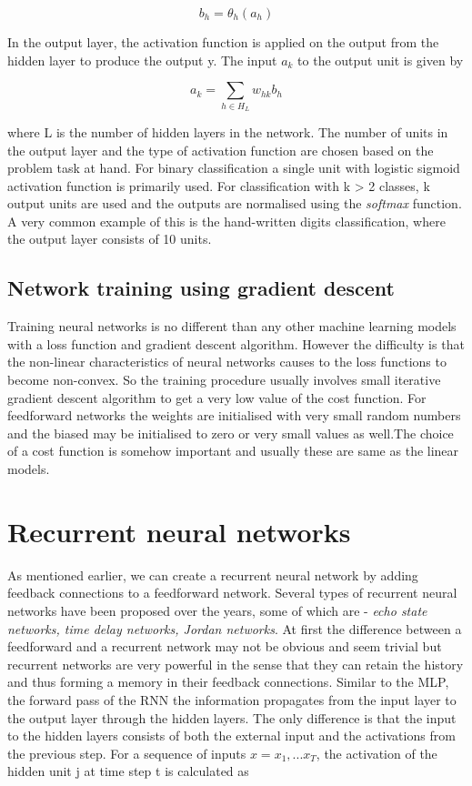     \begin{equation}
        b_{h} = \theta_{h}(a_{h})
    \end{equation}

In the output layer, the activation function is applied on the output from the hidden layer to
produce the output y. The input $a_{k}$ to the output unit is given by

    \begin{equation}
        a_{k} = \displaystyle\sum_{h \in H_{L}} w_{hk}b_{h}
    \end{equation}

where L is the number of hidden layers in the network. The number of units in the output layer
and the type of activation function are chosen based on the problem task at hand. For binary
classification a single unit with logistic sigmoid activation function is primarily used. For
classification with k > 2 classes, k output units are used and the outputs are normalised using
the \emph{softmax} function. A very common example of this is the hand-written digits classification,
where the output layer consists of 10 units.

\subsection {Network training using gradient descent}
Training neural networks is no different than any other machine learning models with a loss
function and gradient descent algorithm. However the difficulty is that the non-linear
characteristics of neural networks causes to the loss functions to become non-convex. So the
training procedure usually involves small iterative gradient descent algorithm to get a very low
value of the cost function. For feedforward networks the weights are initialised with very small
random numbers and the biased may be initialised to zero or very small values as well.The choice
of a cost function is somehow important and usually these are same as the linear models.

\section{Recurrent neural networks}
As mentioned earlier, we can create a recurrent neural network by adding feedback connections to
a feedforward network. Several types of recurrent neural networks have been proposed over the
years, some of which are - \emph{echo state networks, time delay networks, Jordan networks}. At
first the difference between a feedforward and a recurrent network may not be obvious and seem
trivial but recurrent networks are very powerful in the sense that they can retain the history and
thus forming a memory in their feedback connections. Similar to the MLP, the forward pass of the
RNN the information propagates from the input layer to the output layer through the hidden layers.
The only difference is that the input to the hidden layers consists of both the external input and
the activations from the previous step. For a sequence of inputs $x={x_{1},...x_{T}}$, the
activation of the hidden unit j at time step t is calculated as


